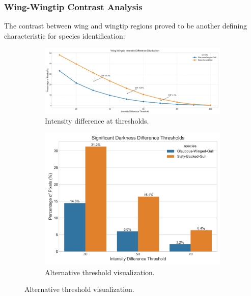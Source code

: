 \documentclass[a4paper,12pt]{report}
\begin{document}
\subsubsection{Wing-Wingtip Contrast Analysis}
The contrast between wing and wingtip regions proved to be another defining characteristic for species identification:

\begin{figure}[H]
    \centering
    \begin{subfigure}[b]{0.32\textwidth}
        \centering
        \includegraphics[width=\textwidth]{images/REPORT_IMAGES_INTENSITY/I1/intensitydiffthreshold.png}
        \caption{Intensity difference at thresholds.}
        \label{fig:intensity_diff_threshold}
    \end{subfigure}
    \hfill
    \begin{subfigure}[b]{0.32\textwidth}
        \centering
        \includegraphics[width=\textwidth]{images/REPORT_IMAGES_INTENSITY/I1/intensitydiffthreshold2.png}
        \caption{Alternative threshold visualization.}
        \label{fig:intensity_diff_threshold2}
    \end{subfigure}

\end{figure}
\end{document}
